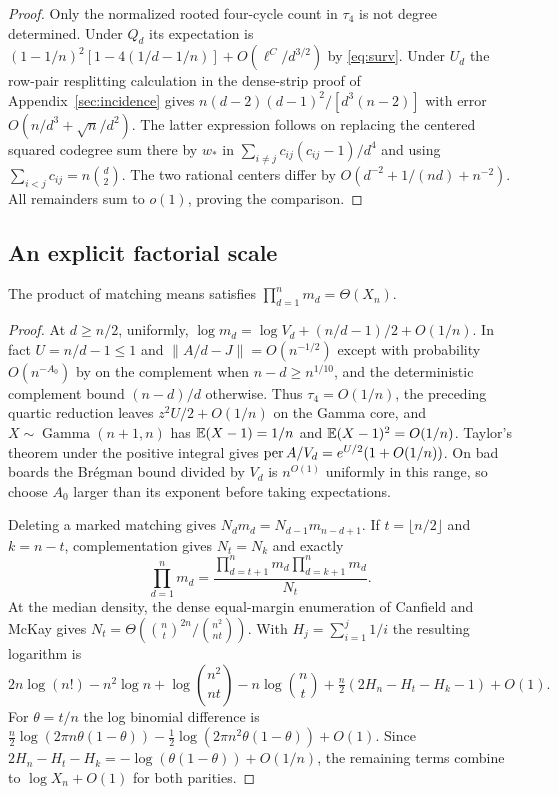 \begin{proof}
Only the normalized rooted four-cycle count in $\tau_4$ is not degree determined. Under $Q_d$ its expectation is $(1-1/n)^2[1-4(1/d-1/n)]+O(\ell^C/d^{3/2})$ by \eqref{eq:surv}. Under $U_d$ the row-pair resplitting calculation in the dense-strip proof of Appendix~\ref{sec:incidence} gives $n(d-2)(d-1)^2/[d^3(n-2)]$ with error $O(n/d^3+\sqrt n/d^2)$. The latter expression follows on replacing the centered squared codegree sum there by $w_*$ in $\sum_{i\ne j}c_{ij}(c_{ij}-1)/d^4$ and using $\sum_{i<j}c_{ij}=n\binom d2$. The two rational centers differ by $O(d^{-2}+1/(nd)+n^{-2})$. All remainders sum to $o(1)$, proving the comparison.
\end{proof}

\subsection{An explicit factorial scale}
\begin{lemma}\label{lem:midpoint}
The product of matching means satisfies $\prod_{d=1}^n m_d=\Theta(X_n)$.
\end{lemma}
\begin{proof}
At $d\ge n/2$, uniformly,
$\log m_d=\log V_d+(n/d-1)/2+O(1/n)$.
In fact $U=n/d-1\le1$ and $\|A/d-J\|=O(n^{-1/2})$ except with probability $O(n^{-A_0})$ by \cite[Theorem B]{TY} on the complement when $n-d\ge n^{1/10}$, and the deterministic complement bound $(n-d)/d$ otherwise. Thus $\tau_4=O(1/n)$, the preceding quartic reduction leaves $z^2U/2+O(1/n)$ on the Gamma core, and $X\sim\operatorname{Gamma}(n+1,n)$ has $\mathbb E(X-1)=1/n$ and $\mathbb E(X-1)^2=O(1/n)$. Taylor's theorem under the positive integral gives $\operatorname{per} A/V_d=e^{U/2}(1+O(1/n))$. On bad boards the Br\'egman bound divided by $V_d$ is $n^{O(1)}$ uniformly in this range, so choose $A_0$ larger than its exponent before taking expectations.

Deleting a marked matching gives $N_dm_d=N_{d-1}m_{n-d+1}$. If $t=\lfloor n/2\rfloor$ and $k=n-t$, complementation gives $N_t=N_k$ and exactly
\[
 \prod_{d=1}^n m_d=
 \frac{\prod_{d=t+1}^n m_d\prod_{d=k+1}^n m_d}{N_t}.
\]
At the median density, the dense equal-margin enumeration of Canfield and McKay \cite{CM} gives $N_t=\Theta(\binom nt^{2n}/\binom{n^2}{nt})$. With $H_j=\sum_{i=1}^j1/i$ the resulting logarithm is
\[
 2n\log(n!)-n^2\log n+\log\binom{n^2}{nt}-n\log\binom nt+
 \tfrac n2(2H_n-H_t-H_k-1)+O(1).
\]
For $\theta=t/n$ the log binomial difference is
$\frac n2\log(2\pi n\theta(1-\theta))-\frac12\log(2\pi n^2\theta(1-\theta))+O(1)$.
Since $2H_n-H_t-H_k=-\log(\theta(1-\theta))+O(1/n)$, the remaining terms combine to $\log X_n+O(1)$ for both parities.
\end{proof}
